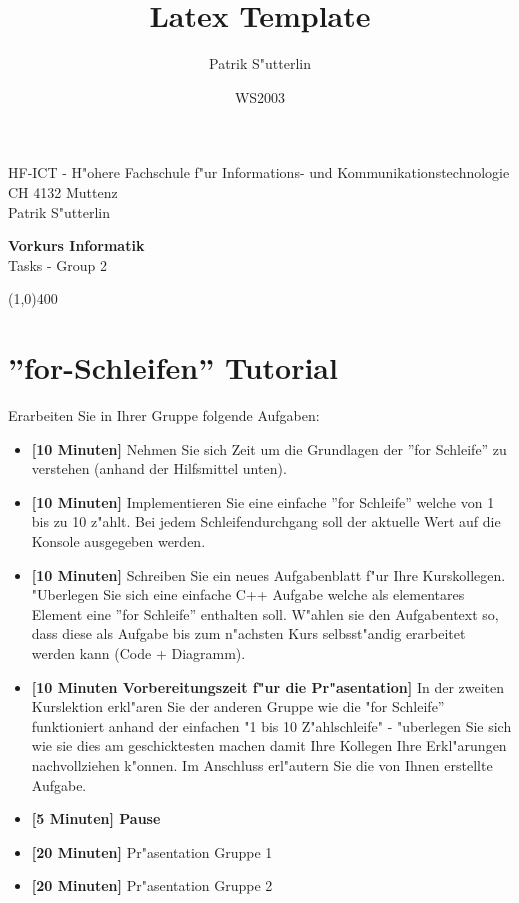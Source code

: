 \documentclass[a4paper,10pt]{article}
\title{Latex Template}
\author{Patrik S"utterlin}
\date{WS2003}
\begin{document}
HF-ICT - H"ohere Fachschule f"ur Informations- und Kommunikationstechnologie\\
CH 4132 Muttenz\\
Patrik S"utterlin

\vspace{2mm}

\begin{center}
{\Large \bf Vorkurs Informatik}\\
Tasks - Group 2
\end{center}

\vspace{2mm}

\line(1,0){400}

\vspace{5mm}

\section{''for-Schleifen'' Tutorial}
Erarbeiten Sie in Ihrer Gruppe folgende Aufgaben:

\begin{itemize}
\item \textbf{[10 Minuten]} Nehmen Sie sich Zeit um die Grundlagen der ''for Schleife'' zu verstehen (anhand der Hilfsmittel unten).
\item \textbf{[10 Minuten]} Implementieren Sie eine einfache ''for Schleife'' welche von 1 bis zu 10 z"ahlt. Bei jedem Schleifendurchgang soll der aktuelle Wert auf die Konsole ausgegeben werden.
\item \textbf{[10 Minuten]}  Schreiben Sie ein neues Aufgabenblatt f"ur Ihre Kurskollegen. "Uberlegen Sie sich eine einfache C++ Aufgabe welche als elementares Element eine ''for Schleife'' enthalten soll. W"ahlen sie den Aufgabentext so, dass diese als Aufgabe bis zum n"achsten Kurs selbsst"andig erarbeitet werden kann (Code + Diagramm).
\item \textbf{[10 Minuten Vorbereitungszeit f"ur die Pr"asentation]} In der zweiten Kurslektion erkl"aren Sie der anderen Gruppe wie die "for Schleife'' funktioniert anhand der einfachen "1 bis 10 Z"ahlschleife" - "uberlegen Sie sich wie sie dies am geschicktesten machen damit Ihre Kollegen Ihre Erkl"arungen nachvollziehen k"onnen. Im Anschluss erl"autern Sie die von Ihnen erstellte Aufgabe.
\item \textbf{[5 Minuten] Pause}
\item \textbf{[20 Minuten]} Pr"asentation Gruppe 1
\item \textbf{[20 Minuten]} Pr"asentation Gruppe 2
\end{itemize}
\end{document}

